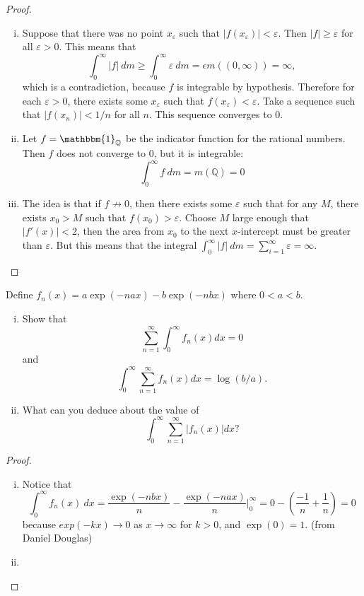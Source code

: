 \documentclass{article}
\newenvironment{problem}[2][Problem]{\begin{trivlist}
\item[\hskip \labelsep {\bfseries #1}\hskip \labelsep {\bfseries #2.}]}{\end{trivlist}}
\begin{document}
\begin{proof}
	\begin{enumerate}[(i)]
    	\item Suppose that there was no point $x_\varepsilon$ such that $|f(x_\varepsilon)| < \varepsilon$. Then $|f| \geq \varepsilon$ for all $\varepsilon > 0$. This means that \[
        	\int_{0}^{\infty} |f|\ dm \geq \int_{0}^{\infty} \varepsilon\ dm = \epsilon m((0, \infty)) = \infty,
        \] which is a contradiction, because $f$ is integrable by hypothesis.
        Therefore for each $\varepsilon > 0$, there exists some $x_\varepsilon$ such that $f(x_\varepsilon) < \varepsilon$. Take a sequence such that $|f(x_n)| < 1/n$ for all $n$. This sequence converges to 0.
        \item Let $f = \mathbbm{1}_{\mathbb{Q}}$ be the indicator function for the rational numbers. Then $f$ does not converge to $0$, but it is integrable: \[
        	\int_0^\infty f\ dm = 
            m(\mathbb{Q}) =
            0
        \]
        \item The idea is that if $f \not\rightarrow 0$, then there exists some $\varepsilon$ such that for any $M$, there exists $x_0 > M$ such that $f(x_0) > \varepsilon$. Choose $M$ large enough that $|f'(x)| < 2$, then the area from $x_0$ to the next $x$-intercept must be greater than $\varepsilon$. But this means that the integral $\int_0^\infty |f|\ dm = \sum_{i = 1}^{\infty} \varepsilon = \infty$.	
    \end{enumerate}
\end{proof}

\pagebreak

\begin{problem}{3} Define $f_n(x) = a\exp(-nax)-b\exp(-nbx)$ where $0 < a < b$.
	\begin{enumerate}[(i)]
    	\item Show that \[
        	\sum_{n = 1}^{\infty} \int_{0}^{\infty} f_n(x) dx = 0
        \] and \[
        	\int_{0}^{\infty} \sum_{n = 1}^{\infty} f_n(x) dx = \log(b/a).
        \]
        \item What can you deduce about the value of \[
	        \int_{0}^{\infty} \sum_{n = 1}^{\infty} \left|f_n(x)\right| dx?
        \]
    \end{enumerate}
\end{problem}

\begin{proof}
	\begin{enumerate}[(i)]
    	\item Notice that \[
        	\int_0^\infty f_n(x)\ dx = 
            \frac{\exp(-nbx)}{n} - \frac{\exp(-nax)}{n} \Big|_{0}^{\infty} = 
            0 - \left(\frac{-1}{n} + \frac{1}{n}\right) = 
            0
        \] because $exp(-kx) \rightarrow 0$ as $x \rightarrow \infty$ for $k > 0$, and $\exp(0) = 1$.
        (from Daniel Douglas)
        \item
    \end{enumerate}
\end{proof}
\end{document}

